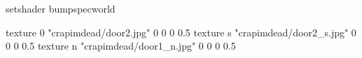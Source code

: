 setshader bumpspecworld

texture 0 "crapimdead/door2.jpg" 0 0 0 0.5
texture s "crapimdead/door2_s.jpg" 0 0 0 0.5
texture n "crapimdead/door1_n.jpg" 0 0 0 0.5
